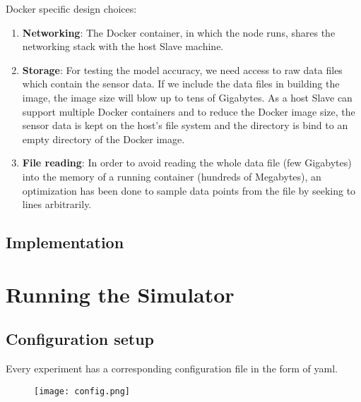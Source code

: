 \documentclass[a4paper, 12pt]{article}
\begin{document}
Docker specific design choices:
\begin{enumerate}
    \item \textbf{Networking}: The Docker container, in which the node runs, shares the networking stack with the host Slave machine.
    \item \textbf{Storage}: For testing the model accuracy, we need access to raw data files which contain the sensor data. If we include the data files in building the image, the image size will blow up to tens of Gigabytes. As a host Slave can support multiple Docker containers and to reduce the Docker image size, the sensor data is kept on the host's file system and the directory is bind to an empty directory of the Docker image.  
    \item \textbf{File reading}: In order to avoid reading the whole data file (few Gigabytes) into the memory of a running container (hundreds of Megabytes), an optimization has been done to sample data points from the file by seeking to lines arbitrarily.
\end{enumerate}

\subsection{Implementation}

\section{Running the Simulator}

\subsection{Configuration setup}
Every experiment has a corresponding configuration file in the form of yaml.
\begin{figure}[ht]
    \begin{center}
        \texttt{[image: config.png]}
    \end{center}
\end{figure}
\end{document}

